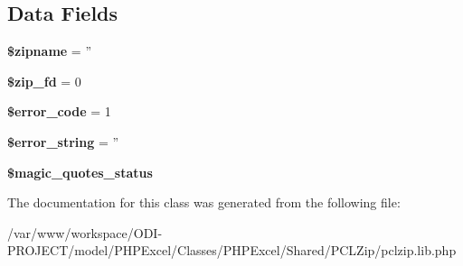 \subsection*{Data Fields}
\begin{DoxyCompactItemize}
\item 
{\bfseries \$zipname} = ''\label{class_pcl_zip_a021434a9d56384eba37a205226f244d7}

\item 
{\bfseries \$zip\+\_\+fd} = 0\label{class_pcl_zip_af3e7fd68547d97857cceadc4d46c761d}

\item 
{\bfseries \$error\+\_\+code} = 1\label{class_pcl_zip_a675de285353d5c434e40a4928a3515fe}

\item 
{\bfseries \$error\+\_\+string} = ''\label{class_pcl_zip_a22323b47b58139586ed855d04138d212}

\item 
{\bfseries \$magic\+\_\+quotes\+\_\+status}\label{class_pcl_zip_a5fe6945b7e1d7bf3d6ee7ed06540b731}

\end{DoxyCompactItemize}


The documentation for this class was generated from the following file\+:\begin{DoxyCompactItemize}
\item 
/var/www/workspace/\+O\+D\+I-\/\+P\+R\+O\+J\+E\+C\+T/model/\+P\+H\+P\+Excel/\+Classes/\+P\+H\+P\+Excel/\+Shared/\+P\+C\+L\+Zip/pclzip.\+lib.\+php\end{DoxyCompactItemize}
